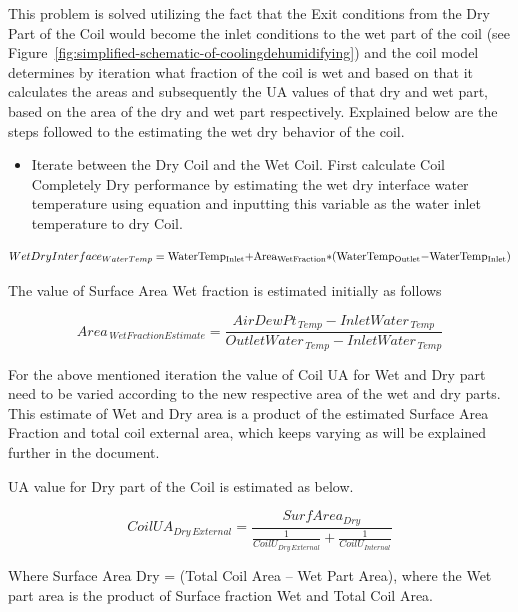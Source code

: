 This problem is solved utilizing the fact that the Exit conditions from the Dry Part of the Coil would become the inlet conditions to the wet part of the coil (see Figure~\ref{fig:simplified-schematic-of-coolingdehumidifying}) and the coil model determines by iteration what fraction of the coil is wet and based on that it calculates the areas and subsequently the UA values of that dry and wet part, based on the area of the dry and wet part respectively. Explained below are the steps followed to the estimating the wet dry behavior of the coil.

\begin{itemize}
  \item Iterate between the Dry Coil and the Wet Coil. First calculate Coil Completely Dry performance by estimating the wet dry interface water temperature using equation and inputting this variable as the water inlet temperature to dry Coil.
\end{itemize}

\begin{equation}
  WetDryInterfac{e_{WaterTemp}} = {\rm{WaterTem}}{{\rm{p}}_{{\rm{Inlet}}}}{\rm{ + Are}}{{\rm{a}}_{{\rm{WetFraction}}}}{\rm{*(WaterTem}}{{\rm{p}}_{{\rm{Outlet}}}}{\rm{ - WaterTem}}{{\rm{p}}_{{\rm{Inlet}}}}{\rm{)}}
\end{equation}

The value of Surface Area Wet fraction is estimated initially as follows

\begin{equation}
Are{a_{\,WetFractionEstimate}} = \frac{{AirDewP{t_{\,Temp}} - InletWate{r_{\,Temp}}}}{{OutletWate{r_{\,Temp}} - InletWate{r_{\,Temp}}}}
\end{equation}

For the above mentioned iteration the value of Coil UA for Wet and Dry part need to be varied according to the new respective area of the wet and dry parts. This estimate of Wet and Dry area is a product of the estimated Surface Area Fraction and total coil external area, which keeps varying as will be explained further in the document.

UA value for Dry part of the Coil is estimated as below.

\begin{equation}
CoilU{A_{Dry\,External}} = \frac{{SurfAre{a_{Dry}}}}{{\frac{1}{{Coil{U_{Dry\,External}}}} + \frac{1}{{Coil{U_{Internal}}}}}}
\end{equation}

Where Surface Area Dry = (Total Coil Area -- Wet Part Area), where the Wet part area is the product of Surface fraction Wet and Total Coil Area.

